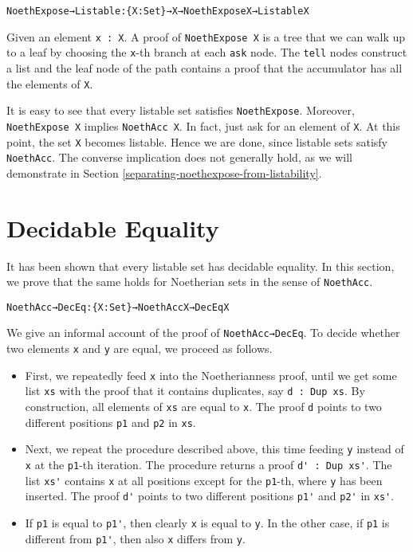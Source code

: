 \documentclass{eptcs}
\begin{document}
\begin{alltt}
NoethExpose→Listable : \{X : Set\} → X → NoethExpose X → Listable X
\end{alltt}
Given an element \verb;x : X;. A proof of \verb;NoethExpose X; is a tree that
we can walk up to a leaf by choosing the \verb;x;-th branch at each \verb;ask;
node. The \verb;tell; nodes construct a list and the leaf node of the path
contains a proof that the accumulator has all the elements of \verb;X;.

It is easy to see that every listable set satisfies
\verb;NoethExpose;. Moreover, \verb;NoethExpose X; implies \verb;NoethAcc X;. In
fact, just ask for an element of \verb;X;. At this point, the set \verb;X;
becomes listable. Hence we are done, since listable sets satisfy
\verb;NoethAcc;. The converse implication does not generally hold, as we will
demonstrate in Section \ref{separating-noethexpose-from-listability}.

\section{Decidable Equality}
\label{decidable-equality}

It has been shown \cite{Firsov-Uustalu} that every listable set has
decidable equality. In this section, we prove that the same holds for
Noetherian sets in the sense of \verb;NoethAcc;.
\begin{alltt}
NoethAcc→DecEq : \{X : Set\} → NoethAcc X → DecEq X
\end{alltt}
We give an informal account of the proof of \verb+NoethAcc→DecEq+. To
decide whether two elements \verb;x; and \verb;y; are equal, we proceed as
follows.
\begin{itemize}
\item
First, we repeatedly feed \verb;x; into the Noetherianness proof, until we get some
list \verb;xs; with the proof that it contains duplicates, say
\verb;d : Dup xs;. By construction, all elements of \verb;xs; are equal to
\verb;x;. The proof \verb;d; points to two different positions \verb;p1; and
\verb;p2; in \verb;xs;.
\item
Next, we repeat the procedure described above, this time feeding \verb;y;
instead of \verb+x+ at the \verb;p1;-th iteration. The procedure returns a proof
\verb;d' : Dup xs';. The list \verb;xs'; contains \verb+x+ at all positions
except for the \verb;p1;-th, where \verb;y; has been inserted. The proof
\verb;d'; points to two different positions \verb;p1'; and \verb;p2'; in
\verb;xs';.
\item
If \verb;p1; is equal to \verb;p1';, then clearly \verb;x; is equal to
\verb;y;. In the other case, if \verb;p1; is different from \verb;p1';, then also
\verb;x; differs from \verb;y;.
\end{itemize}
\end{document}
